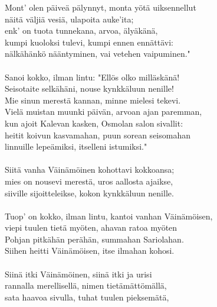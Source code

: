 Mont' olen päiveä pälynnyt, monta yötä uiksennellut       \\
näitä väljiä vesiä, ulapoita auke'ita;                    \\
enk' on tuota tunnekana, arvoa, älyäkänä,                 \\
kumpi kuoloksi tulevi, kumpi ennen ennättävi:             \\
nälkähänkö nääntyminen, vai vetehen vaipuminen."          \\
                                                          \\
Sanoi kokko, ilman lintu: "Ellös olko milläskänä!         \\
Seisotaite selkähäni, nouse kynkkäluun nenille!           \\
Mie sinun merestä kannan, minne mielesi tekevi.           \\
Vielä muistan muunki päivän, arvoan ajan paremman,        \\
kun ajoit Kalevan kasken, Osmolan salon sivallit:         \\
heitit koivun kasvamahan, puun sorean seisomahan          \\
linnuille lepeämiksi, itselleni istumiksi."               \\
                                                          \\
Siitä vanha Väinämöinen kohottavi kokkoansa;              \\
mies on nousevi merestä, uros aallosta ajaikse,           \\
siiville sijoitteleikse, kokon kynkkäluun nenille.        \\
                                                          \\
Tuop' on kokko, ilman lintu, kantoi vanhan Väinämöisen,   \\
viepi tuulen tietä myöten, ahavan ratoa myöten            \\
Pohjan pitkähän perähän, summahan Sariolahan.             \\
Siihen heitti Väinämöisen, itse ilmahan kohosi.           \\
                                                          \\
Siinä itki Väinämöinen, siinä itki ja urisi               \\
rannalla merellisellä, nimen tietämättömällä,             \\
sata haavoa sivulla, tuhat tuulen pieksemätä,             \\

